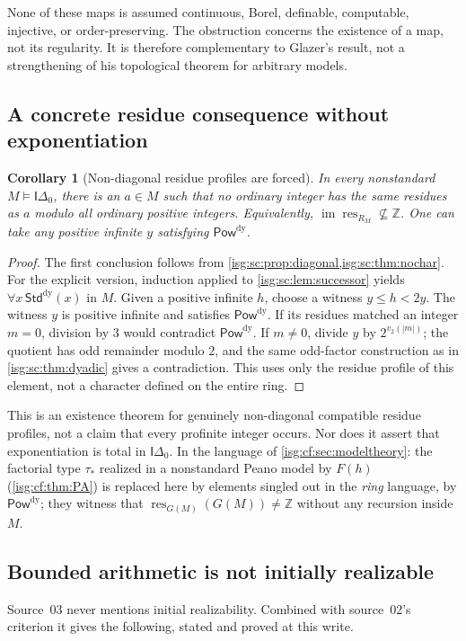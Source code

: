 \documentclass[11pt]{article}
\newtheorem{corollary}[corollary]{Corollary}
\theoremstyle{definition}
\theoremstyle{remark}
\newcommand{\Z}{\mathbb{Z}}
\newcommand{\res}{\operatorname{res}}
\newcommand{\PowDy}{\mathsf{Pow}^{\mathrm{dy}}}
\newcommand{\StdDy}{\mathsf{Std}^{\mathrm{dy}}}
\newcommand{\Idelta}{\mathsf{I}\Delta_0}
\newcommand{\im}{\operatorname{im}}
\begin{document}
\begin{remark}\label{isg:sc:rem:regularity}
None of these maps is assumed continuous, Borel, definable, computable,
injective, or order-preserving. The obstruction concerns the existence of
a map, not its regularity. It is therefore complementary to Glazer's
result, not a strengthening of his topological theorem for arbitrary
models.
\end{remark}

\subsection{A concrete residue consequence without exponentiation}

\begin{corollary}[Non-diagonal residue profiles are forced]\label{isg:sc:cor:profiles}
In every nonstandard $M\models\Idelta$, there is an $a\in M$ such that no
ordinary integer has the same residues as $a$ modulo all ordinary positive
integers. Equivalently, $\im\res_{R_M}\not\subseteq\Z$. One can take any
positive infinite $y$ satisfying $\PowDy$.
\end{corollary}
\begin{proof}
The first conclusion follows from
\cref{isg:sc:prop:diagonal,isg:sc:thm:nochar}. For the explicit version,
induction applied to \cref{isg:sc:lem:successor} yields $\forall
x\,\StdDy(x)$ in $M$. Given a positive infinite $h$, choose a witness
$y\le h<2y$. The witness $y$ is positive infinite and satisfies $\PowDy$.
If its residues matched an integer $m=0$, division by $3$ would contradict
$\PowDy$. If $m\ne0$, divide $y$ by $2^{v_2(|m|)}$; the quotient has odd
remainder modulo $2$, and the same odd-factor construction as in
\cref{isg:sc:thm:dyadic} gives a contradiction. This uses only the residue
profile of this element, not a character defined on the entire ring.
\end{proof}

This is an existence theorem for genuinely non-diagonal compatible residue
profiles, not a claim that every profinite integer occurs. Nor does it
assert that exponentiation is total in $\Idelta$. In the language of
\cref{isg:cf:sec:modeltheory}: the factorial type $\tau_*$ realized in a
nonstandard Peano model by $F(h)$ (\cref{isg:cf:thm:PA}) is replaced here
by elements singled out in the \emph{ring} language, by $\PowDy$; they
witness that $\res_{G(M)}(G(M))\ne\Z$ without any recursion inside $M$.

\subsection{Bounded arithmetic is not initially realizable}\label{isg:sc:sec:fragment}
Source~03 never mentions initial realizability. Combined with source~02's
criterion it gives the following, stated and proved at this write.
\end{document}
